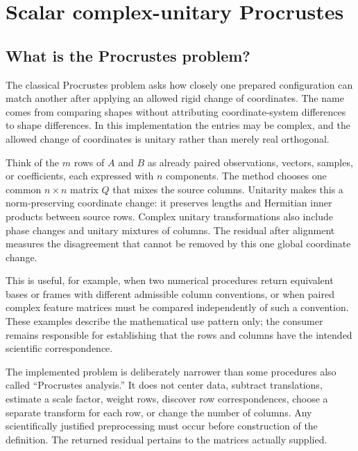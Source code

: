 \chapter{Scalar complex-unitary Procrustes}

\section{What is the Procrustes problem?}
The classical Procrustes problem asks how closely one prepared configuration can match
another after applying an allowed rigid change of coordinates. The name comes from
comparing shapes without attributing coordinate-system differences to shape differences.
In this implementation the entries may be complex, and the allowed change of coordinates
is unitary rather than merely real orthogonal.

Think of the $m$ rows of $A$ and $B$ as already paired observations, vectors, samples, or
coefficients, each expressed with $n$ components. The method chooses one common
$n\times n$ matrix $Q$ that mixes the source columns. Unitarity makes this a
norm-preserving coordinate change: it preserves lengths and Hermitian inner products
between source rows. Complex unitary transformations also include phase changes and
unitary mixtures of columns. The residual after alignment measures the disagreement that
cannot be removed by this one global coordinate change.

This is useful, for example, when two numerical procedures return equivalent bases or
frames with different admissible column conventions, or when paired complex feature
matrices must be compared independently of such a convention. These examples describe
the mathematical use pattern only; the consumer remains responsible for establishing
that the rows and columns have the intended scientific correspondence.

The implemented problem is deliberately narrower than some procedures also called
``Procrustes analysis.'' It does not center data, subtract translations, estimate a
scale factor, weight rows, discover row correspondences, choose a separate transform for
each row, or change the number of columns. Any scientifically justified preprocessing
must occur before construction of the definition. The returned residual pertains to the
matrices actually supplied.

